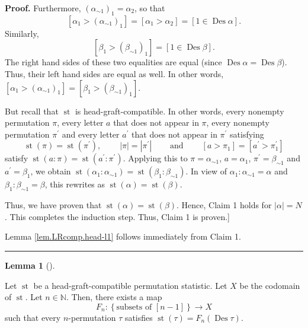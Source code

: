 \documentclass[numbers=enddot,12pt,final,onecolumn,notitlepage]{scrartcl}%
\theoremstyle{definition}
\newtheorem{lem}[theo]{Lemma}
\newenvironment{lemma}[1][]
{\begin{lem}[#1]\begin{leftbar}}
{\end{leftbar}\end{lem}}
\newenvironment{proof}[1][Proof]{\noindent\textbf{#1.} }{\ \rule{0.5em}{0.5em}}
\newenvironment{verlong}{}{}
\begin{document}
\begin{verlong}
\begin{proof}
Furthermore, $\left(  \alpha_{\sim1}\right)  _{1}=\alpha_{2}$, so that
\[
\left[  \alpha_{1}>\left(  \alpha_{\sim1}\right)  _{1}\right]  =\left[
\alpha_{1}>\alpha_{2}\right]  =\left[  1\in\operatorname*{Des}\alpha\right]
.
\]
Similarly,%
\[
\left[  \beta_{1}>\left(  \beta_{\sim1}\right)  _{1}\right]  =\left[
1\in\operatorname*{Des}\beta\right]  .
\]
The right hand sides of these two equalities are equal (since
$\operatorname*{Des}\alpha=\operatorname*{Des}\beta$). Thus, their left hand
sides are equal as well. In other words, $\left[  \alpha_{1}>\left(
\alpha_{\sim1}\right)  _{1}\right]  =\left[  \beta_{1}>\left(  \beta_{\sim
1}\right)  _{1}\right]  $.

But recall that $\operatorname*{st}$ is head-graft-compatible. In other words,
every nonempty permutation $\pi$, every letter $a$ that does not appear in
$\pi$, every nonempty permutation $\pi^{\prime}$ and every letter $a^{\prime}$
that does not appear in $\pi^{\prime}$ satisfying%
\[
\operatorname*{st}\left(  \pi\right)  =\operatorname*{st}\left(  \pi^{\prime
}\right)  ,\ \ \ \ \ \ \ \ \ \ \left\vert \pi\right\vert =\left\vert
\pi^{\prime}\right\vert \ \ \ \ \ \ \ \ \ \ \text{and}%
\ \ \ \ \ \ \ \ \ \ \left[  a>\pi_{1}\right]  =\left[  a^{\prime}>\pi
_{1}^{\prime}\right]
\]
satisfy $\operatorname*{st}\left(  a:\pi\right)  =\operatorname*{st}\left(
a^{\prime}:\pi^{\prime}\right)  $. Applying this to $\pi=\alpha_{\sim1}$,
$a=\alpha_{1}$, $\pi^{\prime}=\beta_{\sim1}$ and $a^{\prime}=\beta_{1}$, we
obtain $\operatorname*{st}\left(  \alpha_{1}:\alpha_{\sim1}\right)
=\operatorname*{st}\left(  \beta_{1}:\beta_{\sim1}\right)  $. In view of
$\alpha_{1}:\alpha_{\sim1}=\alpha$ and $\beta_{1}:\beta_{\sim1}=\beta$, this
rewrites as $\operatorname*{st}\left(  \alpha\right)  =\operatorname*{st}%
\left(  \beta\right)  $.

Thus, we have proven that $\operatorname*{st}\left(  \alpha\right)
=\operatorname*{st}\left(  \beta\right)  $. Hence, Claim 1 holds for
$\left\vert \alpha\right\vert =N$. This completes the induction step. Thus,
Claim 1 is proven.]

Lemma \ref{lem.LRcomp.head-l1} follows immediately from Claim 1.
\end{proof}

\begin{lemma}
\label{lem.LRcomp.head-l2}Let $\operatorname*{st}$ be a head-graft-compatible
permutation statistic. Let $X$ be the codomain of $\operatorname*{st}$. Let
$n\in\mathbb{N}$. Then, there exists a map
\[
F_{n}:\left\{  \text{subsets of }\left[  n-1\right]  \right\}  \rightarrow X
\]
such that every $n$-permutation $\tau$ satisfies $\operatorname*{st}\left(
\tau\right)  =F_{n}\left(  \operatorname*{Des}\tau\right)  $.
\end{lemma}


\end{verlong}
\end{document}
